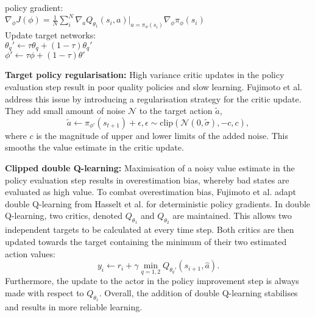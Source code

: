 \begin{algorithm}[hbt!]
{{{            \nonl policy gradient: \hspace{5.2cm}
                 \\
            \nonl $\nabla_\phi J(\phi) = \frac{1}{N} \sum_{i}^{N} \nabla_a Q_{\theta_1} (s_i,a) | _{a=\pi_{\phi}(s_i)} \nabla_\phi \pi_\phi(s_i)$ \\
            Update target networks: \\
            $\theta_{q}' \leftarrow \tau \theta_q + (1 - \tau) \theta_{q}'$ \\
            $\phi' \leftarrow \tau \phi + (1 - \tau) \theta'$ \\
        }
    }
}
\end{algorithm}

\textbf{Target policy regularisation:}
High variance critic updates in the policy evaluation step result in poor quality policies and slow learning.
Fujimoto et al. \cite{Fujimoto2018} address this issue by introducing a regularisation strategy for the critic update. 
They add small amount of noise $\mathcal{N}$ to the target action $\tilde{a}$,
\begin{equation}
    \tilde{a} \leftarrow \pi_{\phi'}(s_{t+1}) + \epsilon, \epsilon \sim \text{clip}(\mathcal{N}(0,\tilde{\sigma}), -c,c),
\end{equation}
where $c$ is the magnitude of upper and lower limits of the added noise.
This smooths the value estimate in the critic update.


\textbf{Clipped double Q-learning:}
Maximisation of a noisy value estimate in the policy evaluation step results in overestimation bias, whereby bad states are evaluated as high value. 
To combat overestimation bias, Fujimoto et al. \cite{Fujimoto2018} adapt double Q-learning from Hasselt et al. \cite{hasselt2015} for deterministic policy gradients. 
In double Q-learning, two critics, denoted $Q_{\theta_1}$ and $Q_{\theta_2}$ are maintained.
This allows two independent targets to be calculated at every time step.
Both critics are then updated towards the target containing the minimum of their two estimated action values:
\begin{equation}
    y_i \leftarrow r_i + \gamma \min_{q=1,2} Q_{\theta_q'}(s_{i+1}, \hat{a}).
\end{equation}
Furthermore, the update to the actor in the policy improvement step is always made with respect to $Q_{\theta_{1}}$.
Overall, the addition of double Q-learning stabilises and results in more reliable learning.

